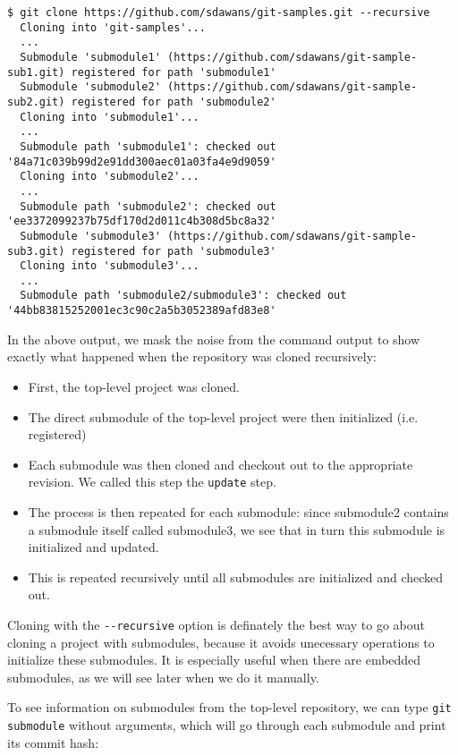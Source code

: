 \documentclass[a4paper]{../../common/tufte-latex/tufte-handout}
\begin{document}
\begin{lstlisting}[style=BashInputStyle]
  $ git clone https://github.com/sdawans/git-samples.git --recursive
  Cloning into 'git-samples'...
  ...
  Submodule 'submodule1' (https://github.com/sdawans/git-sample-sub1.git) registered for path 'submodule1'
  Submodule 'submodule2' (https://github.com/sdawans/git-sample-sub2.git) registered for path 'submodule2'
  Cloning into 'submodule1'...
  ...
  Submodule path 'submodule1': checked out '84a71c039b99d2e91dd300aec01a03fa4e9d9059'
  Cloning into 'submodule2'...
  ...
  Submodule path 'submodule2': checked out 'ee3372099237b75df170d2d011c4b308d5bc8a32'
  Submodule 'submodule3' (https://github.com/sdawans/git-sample-sub3.git) registered for path 'submodule3'
  Cloning into 'submodule3'...
  ...
  Submodule path 'submodule2/submodule3': checked out '44bb83815252001ec3c90c2a5b3052389afd83e8'
\end{lstlisting}

In the above output, we mask the noise from the command output to show exactly what happened when the repository was cloned recursively:

\begin{itemize}
\item First, the top-level project was cloned.
\item The direct submodule of the top-level project were then initialized (i.e. registered)
\item Each submodule was then cloned and checkout out to the appropriate revision. We called this step the \texttt{update} step.
\item The process is then repeated for each submodule: since submodule2 contains a submodule itself called submodule3, we see that in turn this submodule is initialized and updated.
\item This is repeated recursively until all submodules are initialized and checked out.
\end{itemize}

Cloning with the \texttt{-{}-recursive} option is definately the best way to go about cloning a project with submodules, because it avoids unecessary operations to initialize these submodules. It is especially useful when there are embedded submodules, as we will see later when we do it manually.

To see information on submodules from the top-level repository, we can type \texttt{git submodule} without arguments, which will go through each submodule and print its commit hash:
\end{document}
